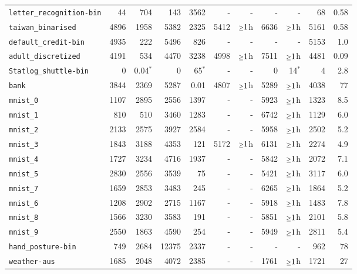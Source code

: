 \begin{tabular}{lrrrrrrrrrr}
\texttt{letter\_recognition-bin} & 44 & 704 & 143 & 3562 & - & - & - & - & 68 & 0.58\\
\texttt{taiwan\_binarised} & 4896 & 1958 & 5382 & 2325 & 5412 & $\mathsmaller{\geq}1$h & 6636 & $\mathsmaller{\geq}1$h & 5161 & 0.58\\
\texttt{default\_credit-bin} & 4935 & 222 & 5496 & 826 & - & - & - & - & 5153 & 1.0\\
\texttt{adult\_discretized} & 4191 & 534 & 4470 & 3238 & 4998 & $\mathsmaller{\geq}1$h & 7511 & $\mathsmaller{\geq}1$h & 4481 & 0.09\\
\texttt{Statlog\_shuttle-bin} & 0 & 0.04$^*$ & 0 & 65$^*$ & - & - & 0 & 14$^*$ & 4 & 2.8\\
\texttt{bank} & 3844 & 2369 & 5287 & 0.01 & 4807 & $\mathsmaller{\geq}1$h & 5289 & $\mathsmaller{\geq}1$h & 4038 & 77\\
\texttt{mnist\_0} & 1107 & 2895 & 2556 & 1397 & - & - & 5923 & $\mathsmaller{\geq}1$h & 1323 & 8.5\\
\texttt{mnist\_1} & 810 & 510 & 3460 & 1283 & - & - & 6742 & $\mathsmaller{\geq}1$h & 1129 & 6.0\\
\texttt{mnist\_2} & 2133 & 2575 & 3927 & 2584 & - & - & 5958 & $\mathsmaller{\geq}1$h & 2502 & 5.2\\
\texttt{mnist\_3} & 1843 & 3188 & 4353 & 121 & 5172 & $\mathsmaller{\geq}1$h & 6131 & $\mathsmaller{\geq}1$h & 2274 & 4.9\\
\texttt{mnist\_4} & 1727 & 3234 & 4716 & 1937 & - & - & 5842 & $\mathsmaller{\geq}1$h & 2072 & 7.1\\
\texttt{mnist\_5} & 2830 & 2556 & 3539 & 75 & - & - & 5421 & $\mathsmaller{\geq}1$h & 3117 & 6.0\\
\texttt{mnist\_7} & 1659 & 2853 & 3483 & 245 & - & - & 6265 & $\mathsmaller{\geq}1$h & 1864 & 5.2\\
\texttt{mnist\_6} & 1208 & 2902 & 2715 & 1167 & - & - & 5918 & $\mathsmaller{\geq}1$h & 1483 & 7.8\\
\texttt{mnist\_8} & 1566 & 3230 & 3583 & 191 & - & - & 5851 & $\mathsmaller{\geq}1$h & 2101 & 5.8\\
\texttt{mnist\_9} & 2550 & 1863 & 4590 & 254 & - & - & 5949 & $\mathsmaller{\geq}1$h & 2811 & 5.4\\
\texttt{hand\_posture-bin} & 749 & 2684 & 12375 & 2337 & - & - & - & - & 962 & 78\\
\texttt{weather-aus} & 1685 & 2048 & 4072 & 2385 & - & - & 1761 & $\mathsmaller{\geq}1$h & 1721 & 27\\
\bottomrule
\end{tabular}

